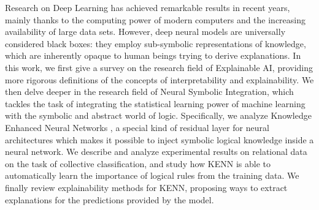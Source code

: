 
Research on Deep Learning has achieved remarkable results in recent years, mainly thanks to the computing power of modern computers and the increasing availability of large data sets. However, deep neural models are universally considered black boxes: they employ sub-symbolic representations of knowledge, which are inherently opaque to human beings trying to derive explanations. In this work, we first give a survey on the research field of Explainable AI, providing more rigorous definitions of the concepts of interpretability and explainability.
We then delve deeper in the research field of Neural Symbolic Integration, which tackles the task of integrating the statistical learning power of machine learning with the symbolic and abstract world of logic. Specifically, we analyze Knowledge Enhanced Neural Networks \cite{daniele2019kenn}, a special kind of residual layer for neural architectures which makes it possible to inject symbolic logical knowledge inside a neural network. We describe and analyze experimental results on relational data on the task of collective classification, and study how KENN is able to automatically learn the importance of logical rules from the training data. We finally review explainability methods for KENN, proposing ways to extract explanations for the predictions provided by the model.